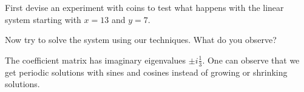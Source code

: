\documentclass[12pt]{amsart}
\numberwithin{equation}{section}
\theoremstyle{plain} %
\theoremstyle{definition}
\theoremstyle{remark}
\begin{document}
First devise an experiment with coins to  test what happens with the linear system starting with $x=13$ and $y=7$.


Now try to solve the system using our techniques. What do you observe?

\begin{framed}
The coefficient matrix has imaginary eigenvalues $\pm i\frac{1}{3}$. One can observe that we get periodic solutions with sines and cosines instead of growing or shrinking solutions.
\end{framed}

\printindex
\end{document}
